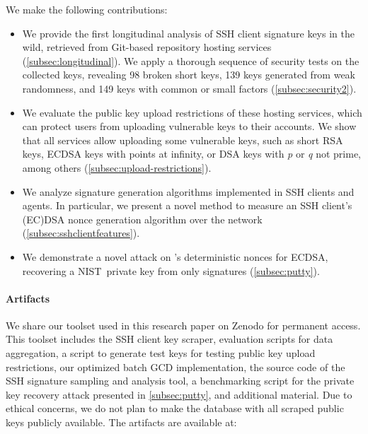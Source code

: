 We make the following contributions:
\begin{itemize}
    \item We provide the first longitudinal analysis of SSH client signature keys in the wild, retrieved from Git-based repository hosting services (\autoref{subsec:longitudinal}). 
    We apply a thorough sequence of security tests on the collected keys, revealing 98 broken short keys, 139 keys generated from weak randomness, and 149 keys with common or small factors (\autoref{subsec:security2}).%
    \item We evaluate the public key upload restrictions of these hosting services, which can protect users from uploading vulnerable keys to their accounts. We show that all services allow uploading some vulnerable keys, such as short RSA keys, ECDSA keys with points at infinity, or DSA keys with \textit{p} or \textit{q} not prime, among others (\autoref{subsec:upload-restrictions}).
    \item We analyze signature generation algorithms implemented in SSH clients and agents. In particular, we present a novel method to measure an SSH client's (EC)DSA nonce generation algorithm over the network (\autoref{subsec:sshclientfeatures}).
    \item We demonstrate a novel attack on \putty's deterministic nonces for ECDSA,
    recovering a NIST~\pfivetwoone private key from only \puttySignatureCount signatures 
    (\autoref{subsec:putty}).
\end{itemize}

\paragraph{Artifacts}

We share our toolset used in this research paper on Zenodo for permanent access. This toolset includes the SSH client key scraper, evaluation scripts for data aggregation, a script to generate test keys for testing public key upload restrictions, our optimized batch GCD implementation, the source code of the SSH signature sampling and analysis tool, a benchmarking script for the \putty \pfivetwoone private key recovery attack presented in \autoref{subsec:putty}, and additional material. Due to ethical concerns, we do not plan to make the database with all scraped public keys publicly available.
%
The artifacts are available at:
\begin{quote}
    \artifactsUrl
\end{quote}

